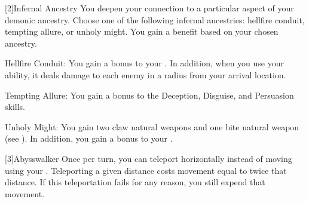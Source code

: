     [2]{Infernal Ancestry} You deepen your connection to a particular aspect of your demonic ancestry.
      Choose one of the following infernal ancestries: hellfire conduit, tempting allure, or unholy might.
      You gain a benefit based on your chosen ancestry.
      \begin{raggeditemize}
        \item Hellfire Conduit: You gain a  bonus to your .
          In addition, when you use your  ability, it deals damage to each enemy in a \smallarea radius from your arrival location.
        \item Tempting Allure: You gain a  bonus to the Deception, Disguise, and Persuasion skills.
        \item Unholy Might: You gain two claw natural weapons and one bite natural weapon (see ).
          In addition, you gain a  bonus to your .
      \end{raggeditemize}

    [3]{Abysswalker} Once per turn, you can teleport horizontally instead of moving using your .
    Teleporting a given distance costs movement equal to twice that distance.
    If this teleportation fails for any reason, you still expend that movement.

